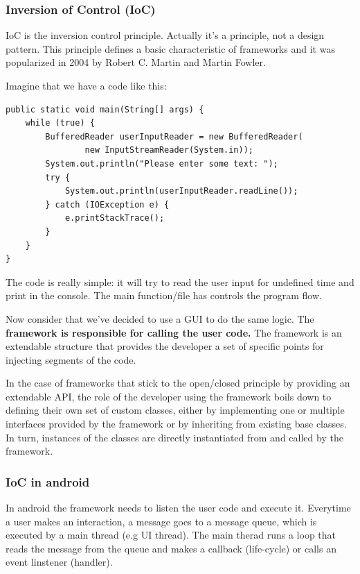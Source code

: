 \subsubsection{Inversion of Control (IoC)}
IoC is the inversion control principle. Actually it's a principle, not a design pattern. 
This principle defines a basic characteristic of frameworks and it was popularized in 2004 by 
Robert C. Martin and Martin Fowler.  

Imagine that we have a code like this:

\begin{lstlisting}
public static void main(String[] args) {
    while (true) {
        BufferedReader userInputReader = new BufferedReader(
                new InputStreamReader(System.in));
        System.out.println("Please enter some text: ");
        try {
            System.out.println(userInputReader.readLine());
        } catch (IOException e) {
            e.printStackTrace();
        }
    }
}
\end{lstlisting}

The code is really simple: it will try to read the user input for undefined time and print in the console.
The main function/file has controls the program flow.  

Now consider that we've decided to use a GUI to do the same logic. The \textbf{framework is responsible for calling the user code.}
The framework is an extendable structure that provides the developer a set of specific points for injecting segments of the code.

\begin{tcolorbox}[title=IoC in short]
    In the case of frameworks that stick to the open/closed principle by 
    providing an extendable API, the role of the developer using the framework 
    boils down to defining their own set of custom classes, either by implementing 
    one or multiple interfaces provided by the framework or by inheriting from 
    existing base classes. In turn, instances of the classes are directly 
    instantiated from and called by the framework.
\end{tcolorbox}

\subsubsection{IoC in android}
In android the framework needs to listen the user code and execute it. Everytime a user makes an interaction, a message goes 
to a message queue, which is executed by a main thread (e.g UI thread). The main therad runs a 
loop that reads the message from the queue and makes a callback (life-cycle) or calls an event linstener (handler).

